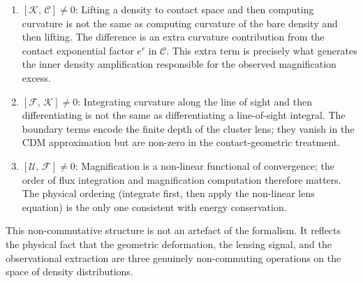 \documentclass[11pt,a4paper,openright]{book}
\theoremstyle{dm3thm}
\theoremstyle{dm3def}
\newcommand{\comm}[2]{[#1,\,#2]}
\newcommand{\UU}{\mathcal{U}}
\newcommand{\FF}{\mathcal{F}}
\newcommand{\KK}{\mathcal{K}}
\newcommand{\CC}{\mathcal{C}}
\begin{document}
\begin{enumerate}
  \item \textbf{$\comm{\KK}{\CC}\neq 0$}: Lifting a density to contact space
    and then computing curvature is not the same as computing curvature of the
    bare density and then lifting.  The difference is an extra curvature
    contribution from the contact exponential factor $e^r$ in $\CC$.  This
    extra term is precisely what generates the inner density amplification
    responsible for the observed magnification excess.

  \item \textbf{$\comm{\FF}{\KK}\neq 0$}: Integrating curvature along the
    line of sight and then differentiating is not the same as differentiating
    a line-of-sight integral.  The boundary terms encode the finite depth of
    the cluster lens; they vanish in the CDM approximation but are non-zero
    in the contact-geometric treatment.

  \item \textbf{$\comm{\UU}{\FF}\neq 0$}: Magnification is a non-linear
    functional of convergence; the order of flux integration and
    magnification computation therefore matters.  The physical ordering
    (integrate first, then apply the non-linear lens equation) is the only
    one consistent with energy conservation.
\end{enumerate}

This non-commutative structure is not an artefact of the formalism.  It
reflects the physical fact that the geometric deformation, the lensing signal,
and the observational extraction are three genuinely non-commuting operations
on the space of density distributions.
\end{document}
